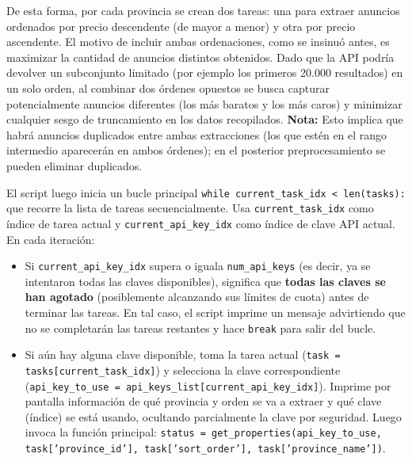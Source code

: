 \documentclass[a4paper,11pt]{book}
\begin{document}
De esta forma, por cada provincia se crean dos tareas: una para extraer anuncios ordenados por precio descendente (de mayor a menor) y otra por precio ascendente. El motivo de incluir ambas ordenaciones, como se insinuó antes, es maximizar la cantidad de anuncios distintos obtenidos. Dado que la API podría devolver un subconjunto limitado (por ejemplo los primeros 20.000 resultados) en un solo orden, al combinar dos órdenes opuestos se busca capturar potencialmente anuncios diferentes (los más baratos y los más caros) y minimizar cualquier sesgo de truncamiento en los datos recopilados. \textbf{Nota:} Esto implica que habrá anuncios duplicados entre ambas extracciones (los que estén en el rango intermedio aparecerán en ambos órdenes); en el posterior preprocesamiento se pueden eliminar duplicados.

El script luego inicia un bucle principal \texttt{while current\_task\_idx < len(tasks):} que recorre la lista de tareas secuencialmente. Usa \texttt{current\_task\_idx} como índice de tarea actual y \texttt{current\_api\_key\_idx} como índice de clave API actual. En cada iteración:
\begin{itemize}
    \item Si \texttt{current\_api\_key\_idx} supera o iguala \texttt{num\_api\_keys} (es decir, ya se intentaron todas las claves disponibles), significa que \textbf{todas las claves se han agotado} (posiblemente alcanzando sus límites de cuota) antes de terminar las tareas. En tal caso, el script imprime un mensaje advirtiendo que no se completarán las tareas restantes y hace \texttt{break} para salir del bucle.
    \item Si aún hay alguna clave disponible, toma la tarea actual (\texttt{task = tasks[current\_task\_idx]}) y selecciona la clave correspondiente (\texttt{api\_key\_to\_use = api\_keys\_list[current\_api\_key\_idx]}). Imprime por pantalla información de qué provincia y orden se va a extraer y qué clave (índice) se está usando, ocultando parcialmente la clave por seguridad. Luego invoca la función principal: \texttt{status = get\_properties(api\_key\_to\_use, task['province\_id'], task['sort\_order'], task['province\_name'])}.
\end{itemize}
\end{document}
